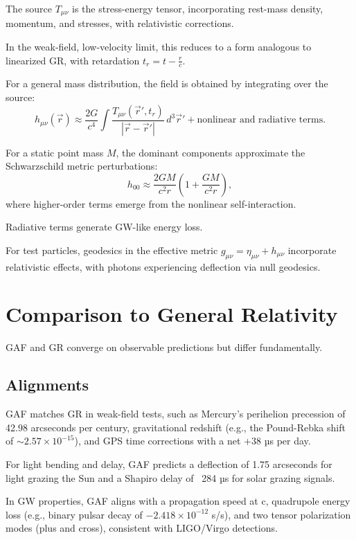 \documentclass{article}
\begin{document}
The source $ T_{\mu\nu} $ is the stress-energy tensor, incorporating rest-mass density, momentum, and stresses, with relativistic corrections.

In the weak-field, low-velocity limit, this reduces to a form analogous to linearized GR, with retardation $ t_r = t - \frac{r}{c} $.

For a general mass distribution, the field is obtained by integrating over the source:
$$h_{\mu\nu}(\vec{r}) \approx \frac{2G}{c^4} \int \frac{T_{\mu\nu}(\vec{r}', t_r)}{|\vec{r} - \vec{r}'|} \, d^3 \vec{r}' + \text{nonlinear and radiative terms}.$$

For a static point mass $ M $, the dominant components approximate the Schwarzschild metric perturbations:
$$h_{00} \approx \frac{2 G M}{c^2 r} \left( 1 + \frac{G M}{c^2 r} \right),$$
where higher-order terms emerge from the nonlinear self-interaction.

Radiative terms generate GW-like energy loss. 

For test particles, geodesics in the effective metric $ g_{\mu\nu} = \eta_{\mu\nu} + h_{\mu\nu} $ incorporate relativistic effects, with photons experiencing deflection via null geodesics.

\section{Comparison to General Relativity}

GAF and GR converge on observable predictions but differ fundamentally.

\subsection{Alignments}

GAF matches GR in weak-field tests, such as Mercury's perihelion precession of 42.98 arcseconds per century, gravitational redshift (e.g., the Pound-Rebka shift of \( \sim 2.57 \times 10^{-15} \)), and GPS time corrections with a net +38 µs per day.

For light bending and delay, GAF predicts a deflection of 1.75 arcseconds for light grazing the Sun and a Shapiro delay of ~284 µs for solar grazing signals.

In GW properties, GAF aligns with a propagation speed at c, quadrupole energy loss (e.g., binary pulsar decay of \( -2.418 \times 10^{-12} \) s/s), and two tensor polarization modes (plus and cross), consistent with LIGO/Virgo detections.
\end{document}
